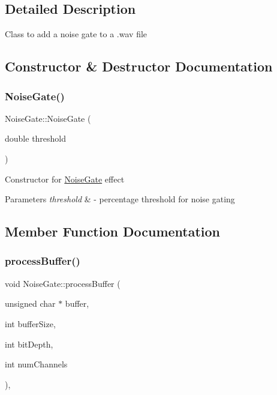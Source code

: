 \subsection{Detailed Description}
Class to add a noise gate to a .wav file 

\subsection{Constructor \& Destructor Documentation}
\mbox{\label{classNoiseGate_a5106cfbd673a9ba6faf5f283a92ebf93}} 
\subsubsection{\texorpdfstring{Noise\+Gate()}{NoiseGate()}}
{\footnotesize\ttfamily Noise\+Gate\+::\+Noise\+Gate (\begin{DoxyParamCaption}\item[{double}]{threshold }\end{DoxyParamCaption})}

Constructor for \hyperlink{classNoiseGate}{Noise\+Gate} effect 
\begin{DoxyParams}{Parameters}
{\em threshold} & -\/ percentage threshold for noise gating \\
\hline
\end{DoxyParams}


\subsection{Member Function Documentation}
\mbox{\label{classNoiseGate_a7d58bdbe85f4e2709c77f5d3d5f34e09}} 
\subsubsection{\texorpdfstring{process\+Buffer()}{processBuffer()}}
{\footnotesize\ttfamily void Noise\+Gate\+::process\+Buffer (\begin{DoxyParamCaption}\item[{unsigned char $\ast$}]{buffer,  }\item[{int}]{buffer\+Size,  }\item[{int}]{bit\+Depth,  }\item[{int}]{num\+Channels }\end{DoxyParamCaption})\hspace{0.3cm}{\ttfamily [override]}, {\ttfamily [virtual]}}

